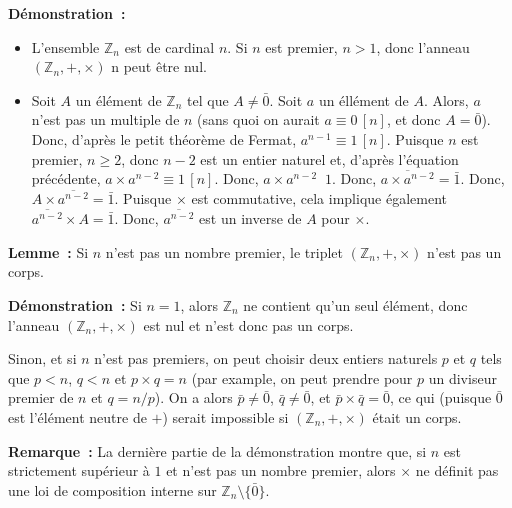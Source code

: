 \noindent\textbf{Démonstration :} 
\begin{itemize}[nosep]
    \item L'ensemble $\mathbb{Z}_n$ est de cardinal $n$. 
        Si $n$ est premier, $n > 1$, donc l'anneau $\left( \mathbb{Z}_n, +, \times \right)$ n peut être nul.
    \item Soit $A$ un élément de $\mathbb{Z}_n$ tel que $A \neq \bar{0}$.
        Soit $a$ un éllément de $A$. 
        Alors, $a$ n'est pas un multiple de $n$ (sans quoi on aurait $a \equiv 0 \, [n]$, et donc $A = \bar{0}$).
        Donc, d'après le petit théorème de Fermat, $a^{n-1} \equiv 1 \, [n]$. 
        Puisque $n$ est premier, $n \geq 2$, donc $n-2$ est un entier naturel et, d'après l'équation précédente, $a \times a^{n-2} \equiv 1 \, [n]$. 
        Donc, $a \times a^{n-2} \mathop{R_n} 1$.
        Donc, $\overline{a \times a^{n-2}} = \bar{1}$.
        Donc, $A \times \overline{a^{n-2}} = \bar{1}$.
        Puisque $\times$ est commutative, cela implique également $\overline{a^{n-2}} \times A = \bar{1}$.
        Donc, $\overline{a^{n-2}}$ est un inverse de $A$ pour $\times$.
\end{itemize}

\done

\medskip

\noindent\textbf{Lemme :} Si $n$ n'est pas un nombre premier, le triplet $\left( \mathbb{Z}_n, +, \times \right)$ n'est pas un corps. 

\medskip

\noindent\textbf{Démonstration :} 
    Si $n = 1$, alors $\mathbb{Z}_n$ ne contient qu'un seul élément, donc l'anneau $\left(\mathbb{Z}_n, +, \times \right)$ est nul et n'est donc pas un corps.

    Sinon, et si $n$ n'est pas premiers, on peut choisir deux entiers naturels $p$ et $q$ tels que $p < n$, $q < n$ et $p \times q = n$ (par example, on peut prendre pour $p$ un diviseur premier de $n$ et $q = n / p$).
    On a alors $\bar{p} \neq \bar{0}$, $\bar{q} \neq \bar{0}$, et $\bar{p} \times \bar{q} = \bar{0}$, ce qui (puisque $\bar{0}$ est l'élément neutre de $+$) serait impossible si $\left(\mathbb{Z}_n, +, \times \right)$ était un corps. 

    \done

\medskip

\noindent\textbf{Remarque :} La dernière partie de la démonstration montre que, si $n$ est strictement supérieur à $1$ et n'est pas un nombre premier, alors $\times$ ne définit pas une loi de composition interne sur $\mathbb{Z}_n \setminus \lbrace \bar{0} \rbrace$.

